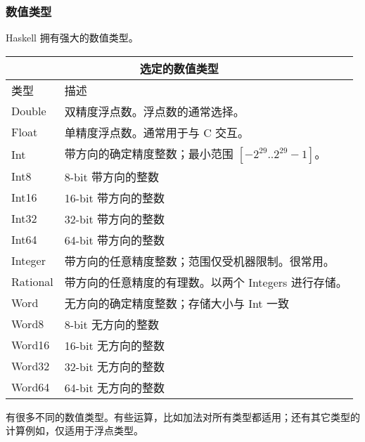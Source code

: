 \documentclass[./main.tex]{subfiles}
\begin{document}
\newpage
\subsubsection*{数值类型}

Haskell 拥有强大的数值类型。

\begin{center}
  \begin{tabular}{|l|l|}
    \hline
    \multicolumn{2}{|c|}{\textbf{选定的数值类型}}        \\
    \hline
    类型       & 描述                                 \\
    \hline
    Double   & 双精度浮点数。浮点数的通常选择。                   \\
    Float    & 单精度浮点数。通常用于与 C 交互。                 \\
    Int      & 带方向的确定精度整数；最小范围 $[-2^29..2^29-1]$。 \\
    Int8     & 8-bit 带方向的整数                       \\
    Int16    & 16-bit 带方向的整数                      \\
    Int32    & 32-bit 带方向的整数                      \\
    Int64    & 64-bit 带方向的整数                      \\
    Integer  & 带方向的任意精度整数；范围仅受机器限制。很常用。           \\
    Rational & 带方向的任意精度的有理数。以两个 Integers 进行存储。    \\
    Word     & 无方向的确定精度整数；存储大小与 Int 一致            \\
    Word8    & 8-bit 无方向的整数                       \\
    Word16   & 16-bit 无方向的整数                      \\
    Word32   & 32-bit 无方向的整数                      \\
    Word64   & 64-bit 无方向的整数                      \\
    \hline
  \end{tabular}
\end{center}

有很多不同的数值类型。有些运算，比如加法对所有类型都适用；还有其它类型的计算例如，仅适用于浮点类型。
\end{document}
